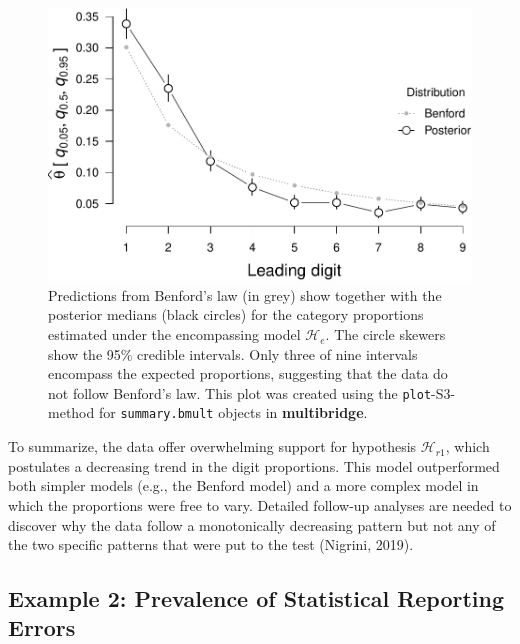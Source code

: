 \documentclass[
  english,
  man,floatsintext]{apa6}
\begin{document}
\begin{figure}
\centering
\includegraphics{Rpackage_paper_files/figure-latex/benford-alt-1.pdf}
\caption{\label{fig:benford-alt}Predictions from Benford's law (in grey) show together with the posterior medians (black circles) for the category proportions estimated under the encompassing model \(\mathcal{H}_e\). The circle skewers show the 95\% credible intervals. Only three of nine intervals encompass the expected proportions, suggesting that the data do not follow Benford's law. This plot was created using the \texttt{plot}-S3-method for \texttt{summary.bmult} objects in \textbf{multibridge}.}
\end{figure}

To summarize, the data offer overwhelming support for hypothesis \(\mathcal{H}_{r1}\), which postulates a decreasing trend in the digit proportions. This model outperformed both simpler models (e.g., the Benford model) and a more complex model in which the proportions were free to vary.
Detailed follow-up analyses are needed to discover why the data follow a monotonically decreasing pattern but not any of the two specific patterns that were put to the test (Nigrini, 2019).

\hypertarget{example-2-prevalence-of-statistical-reporting-errors}{%
\subsection{Example 2: Prevalence of Statistical Reporting Errors}\label{example-2-prevalence-of-statistical-reporting-errors}}
\end{document}
